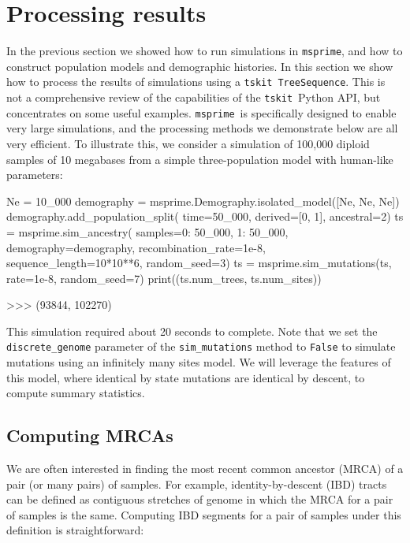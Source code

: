 \documentclass[graybox]{svmult}
\newcommand{\msprime}[0]{\texttt{msprime}}
\newcommand{\tskit}[0]{\texttt{tskit}}
\begin{document}
\section{Processing results}\label{processing-results}

In the previous section we showed how to run simulations in \msprime, and
how to construct population models and demographic histories. In this
section we show how to process the results of simulations using
a \tskit\ \texttt{TreeSequence}. This is not a
comprehensive review of the capabilities of the \tskit\ Python API, but
concentrates on some useful examples.
\msprime\ is specifically designed to enable very large simulations, and
the processing methods we demonstrate below are all very efficient. To
illustrate this, we consider a simulation of 100,000 diploid samples of 10 megabases
from a simple three-population model with human-like parameters:

\begin{pythoncode}
Ne = 10_000
demography = msprime.Demography.isolated_model([Ne, Ne, Ne])
demography.add_population_split(
    time=50_000, derived=[0, 1], ancestral=2)
ts = msprime.sim_ancestry(
    samples={0: 50_000, 1: 50_000},
    demography=demography, recombination_rate=1e-8,
    sequence_length=10*10**6, random_seed=3)
ts = msprime.sim_mutations(ts, rate=1e-8, random_seed=7)
print((ts.num_trees, ts.num_sites))

>>> (93844, 102270)
\end{pythoncode}

This simulation required about 20 seconds to complete. Note that we set the
\texttt{discrete\_genome} parameter of the \texttt{sim\_mutations} method to
\texttt{False} to simulate mutations using an infinitely many sites model.
We will leverage the features of this model, where identical by state
mutations are identical by descent, to compute summary statistics.


\subsection{Computing MRCAs}\label{computing-mrcas}
We are often interested in finding the most recent common ancestor (MRCA)
of a pair (or many pairs) of samples. For example, identity-by-descent
(IBD) tracts can be defined as contiguous stretches of genome in which the
MRCA for a pair of samples is the same. Computing IBD segments for a
pair of samples under this definition is straightforward:
\end{document}

